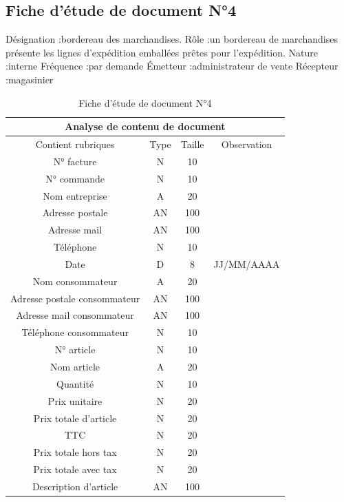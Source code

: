 \documentclass[edit,12pt,a4paper,ChapStyle,oneside,doubleinterligne]{report}
\begin{document}
\newpage
\subsection{Fiche d’étude de document N°4}
Désignation :bordereau des marchandises.
\newline Rôle :un bordereau de marchandises présente les lignes d'expédition emballées prêtes pour l'expédition.
\newline Nature :interne
\newline Fréquence :par demande
\newline Émetteur :administrateur de vente
\newline Récepteur :magasinier\cite{bordereau}
\begin{table}[h!]
    \centering
    \begin{tabular}{|c|c|c|c|}
         \hline
\multicolumn{4}{|c|}{Analyse de contenu de document}\\
\hline
Contient rubriques & Type & Taille & Observation\\
\hline
 N° facture  & N & 10 & \\
 N° commande  & N & 10 & \\
 Nom entreprise & A & 20 & \\
 Adresse postale & AN & 100 & \\
 Adresse mail & AN & 100 & \\
 Téléphone & N & 10 & \\
Date & D & 8 & JJ/MM/AAAA \\
Nom consommateur & A & 20 & \\
Adresse postale consommateur & AN & 100 & \\
Adresse mail consommateur & AN & 100 & \\
Téléphone consommateur & N & 10 & \\
N° article & N & 10 & \\
Nom article & A & 20 & \\
Quantité & N & 10 & \\
Prix unitaire & N & 20 & \\
Prix totale d’article & N & 20 & \\
TTC & N & 20 & \\
Prix totale hors tax & N & 20 & \\
Prix totale avec tax & N & 20 & \\
Description d’article & AN & 100 & \\
\hline
    \end{tabular}
    \caption{Fiche d’étude de document N°4}
    \label{tab:4}
\end{table}
\end{document}
